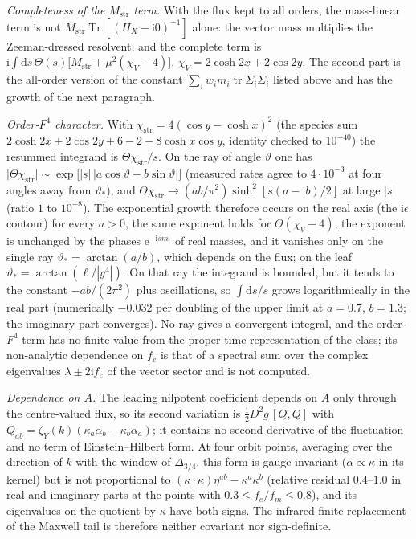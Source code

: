 \emph{Completeness of the \(M_{\mathrm{str}}\) term.} With the flux kept to all orders, the mass-linear term is not \(M_{\mathrm{str}}\operatorname{Tr}[(H_X-\mathrm i0)^{-1}]\) alone: the vector mass multiplies the Zeeman-dressed resolvent, and the complete term is \(\mathrm i\!\int\!\mathrm ds\,\Theta(s)\bigl[M_{\mathrm{str}}+\mu^2(\chi_V-4)\bigr]\), \(\chi_V=2\cosh2x+2\cos2y\). The second part is the all-order version of the constant \(\sum_iw_im_i\operatorname{tr}\Sigma_i\Sigma_i\) listed above and has the growth of the next paragraph.

\emph{Order-\(F^4\) character.} With \(\chi_{\mathrm{str}}=4(\cos y-\cosh x)^2\) (the species sum \(2\cosh2x+2\cos2y+6-2-8\cosh x\cos y\), identity checked to \(10^{-40}\)) the resummed integrand is \(\Theta\chi_{\mathrm{str}}/s\). On the ray of angle \(\vartheta\) one has \(\bigl|\Theta\chi_{\mathrm{str}}\bigr|\sim\exp\bigl[|s|\,|a\cos\vartheta-b\sin\vartheta|\bigr]\) (measured rates agree to \(4\cdot10^{-3}\) at four angles away from \(\vartheta_*\)), and \(\Theta\chi_{\mathrm{str}}\to(ab/\pi^2)\sinh^2[s(a-\mathrm ib)/2]\) at large \(|s|\) (ratio \(1\) to \(10^{-8}\)). The exponential growth therefore occurs on the real axis (the \(\mathrm i\epsilon\) contour) for every \(a>0\), the same exponent holds for \(\Theta(\chi_V-4)\), the exponent is unchanged by the phases \(\mathrm e^{-\mathrm ism_i}\) of real masses, and it vanishes only on the single ray \(\vartheta_*=\arctan(a/b)\), which depends on the flux; on the leaf \(\vartheta_*=\arctan(\ell/|y^4|)\). On that ray the integrand is bounded, but it tends to the constant \(-ab/(2\pi^2)\) plus oscillations, so \(\int\mathrm ds/s\) grows logarithmically in the real part (numerically \(-0.032\) per doubling of the upper limit at \(a=0.7\), \(b=1.3\); the imaginary part converges). No ray gives a convergent integral, and the order-\(F^4\) term has no finite value from the proper-time representation of the class; its non-analytic dependence on \(f_e\) is that of a spectral sum over the complex eigenvalues \(\lambda\pm2\mathrm if_e\) of the vector sector and is not computed.

\emph{Dependence on \(A\).} The leading nilpotent coefficient depends on \(A\) only through the centre-valued flux, so its second variation is \(\tfrac12D^2g\,[Q,Q]\) with \(Q_{ab}=\zeta_Y(k)(\kappa_a\alpha_b-\kappa_b\alpha_a)\); it contains no second derivative of the fluctuation and no term of Einstein--Hilbert form. At four orbit points, averaging over the direction of \(k\) with the window of \(\Delta_{3/4}\), this form is gauge invariant (\(\alpha\propto\kappa\) in its kernel) but is not proportional to \((\kappa\cdot\kappa)\eta^{ab}-\kappa^a\kappa^b\) (relative residual \(0.4\)--\(1.0\) in real and imaginary parts at the points with \(0.3\le f_e/f_m\le0.8\)), and its eigenvalues on the quotient by \(\kappa\) have both signs. The infrared-finite replacement of the Maxwell tail is therefore neither covariant nor sign-definite.

